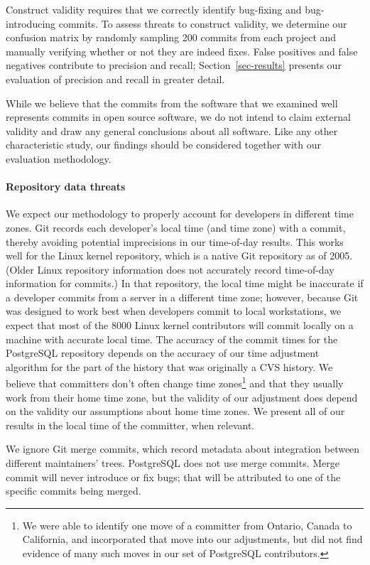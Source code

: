 Construct validity requires that we correctly identify bug-fixing and
bug-introducing commits. To assess threats to construct validity, we determine
our confusion matrix by randomly sampling 200 commits from each project and
manually verifying whether or not they are indeed fixes. False positives and
false negatives contribute to precision and recall; Section~\ref{sec-results}
presents our evaluation of precision and recall in greater detail.

While we believe that the commits from the software that we examined well
represents commits in open source software, we do not intend to claim external
validity and draw any general conclusions about all software.  Like any other
characteristic study, our findings should be considered together with our
evaluation methodology.

\paragraph{Repository data threats}

We expect our methodology to properly account for developers in different time
zones. Git records each developer's local time (and time zone) with a commit,
thereby avoiding potential imprecisions in our time-of-day results. This works
well for the Linux kernel repository, which is a native Git repository as of
2005. (Older Linux repository information does not accurately record time-of-day
information for commits.) In that repository, the local time might be inaccurate
if a developer commits from a server in a different time zone; however, because
Git was designed to work best when developers commit to local workstations, we
expect that most of the 8000 Linux kernel contributors will commit locally on a
machine with accurate local time.  The accuracy of the commit times for the
PostgreSQL repository depends on the accuracy of our time adjustment algorithm
for the part of the history that was originally a CVS history. We believe that
committers don't often change time zones\footnote{We were able to identify one
  move of a committer from Ontario, Canada to California, and incorporated that move
  into our adjustments, but did not find evidence of many such moves in our set
  of PostgreSQL contributors.} and that they usually work from their home time
zone, but the validity of our adjustment does depend on the validity our
assumptions about home time zones. We present all of our results in the local
time of the committer, when relevant.

We ignore Git merge commits, which record metadata about integration between
different maintainers' trees. PostgreSQL does not use merge commits. Merge
commit will never introduce or fix bugs; that will be attributed to one of the
specific commits being merged.

